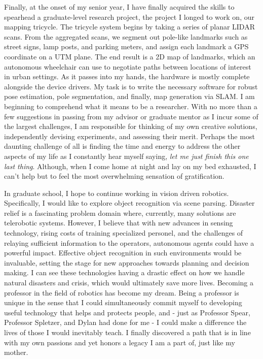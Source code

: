 \documentclass[10pt]{article}
\begin{document}
Finally, at the onset of my senior year, I have finally acquired the skills to
spearhead a graduate-level research project, the project I longed to work on,
our mapping tricycle. The tricycle system begins by taking a series of planar
LIDAR scans. From the aggregated scans, we segment out pole-like landmarks such
as street signs, lamp posts, and parking meters, and assign each landmark a GPS
coordinate on a UTM plane.  The end result is a 2D map of landmarks, which an
autonomous wheelchair can use to negotiate paths between locations of interest
in urban settings. As it passes into my hands, the hardware is mostly complete
alongside the device drivers. My task is to write the necessary software for
robust pose estimation, pole segmentation, and finally, map generation via
SLAM. I am beginning to comprehend what it means to be a researcher. With no
more than a few suggestions in passing from my advisor or graduate mentor as I
incur some of the largest challenges, I am responsible for thinking of my own
creative solutions, independently devising experiments, and assessing their
merit.  Perhaps the most daunting challenge of all is finding the time  and
energy to address the other aspects of my life as I constantly hear myself
saying, \emph{let me just finish this one last thing}. Although, when I come
home at night and lay on my bed exhausted, I can't help but to feel the most
overwhelming sensation of gratification.

In graduate school, I hope to continue working in vision driven robotics.
Specifically, I would like to explore object recognition via scene parsing.
Disaster relief is a fascinating problem domain where, currently, many
solutions are telerobotic systems. However, I believe that with new advances in
sensing technology, rising costs of training specialized personel, and the
challenges of relaying sufficient information to the operators, autonomous
agents could have a powerful impact. Effective object recognition in such
environments would be invaluable, setting the stage for new approaches towards
planning and decision making. I can see these technologies having a drastic
effect on how we handle natural disasters and crisis, which would ultimately
save more lives. Becoming a professor in the field of robotics has become my
dream. Being a professor is unique in the sense that I could simultaneously
commit myself to developing useful technology that helps and protects people,
and - just as Professor Spear, Professor Spletzer, and Dylan had done for me -
I could make a difference the lives of those I would inevitably teach. I
finally discovered a path that is in line with my own passions and yet honors a
legacy I am a part of, just like my mother.
\end{document}
